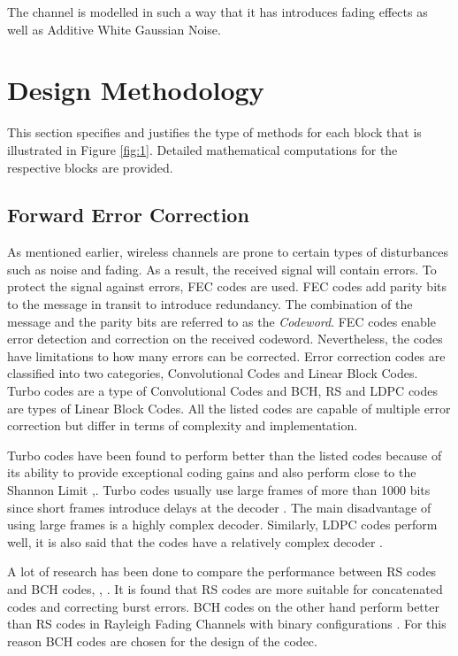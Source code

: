 \documentclass[pdftex,11pt,a4paper]{article}
\begin{document}
The channel is modelled in such a way that it has introduces fading effects as well as Additive White Gaussian Noise.

\section{Design Methodology}
This section specifies and justifies the type of methods for each block that is illustrated in Figure \ref{fig:1}. Detailed mathematical computations for the respective blocks are provided.

\subsection{Forward Error Correction}
As mentioned earlier, wireless channels are prone to certain types of disturbances such as noise and fading. As a result, the received signal will contain errors. To protect the signal against errors, FEC codes are used. FEC codes add parity bits to the message in transit to introduce redundancy. The combination of the message and the parity bits are referred to as the \textit{Codeword}. FEC codes enable error detection and correction on the received codeword. Nevertheless, the codes have limitations to how many errors can be corrected. Error correction codes are classified into two categories, Convolutional Codes and Linear Block Codes. Turbo codes are a type of Convolutional Codes and BCH, RS and LDPC codes are types of Linear Block Codes. All the listed codes are capable of multiple error correction but differ in terms of complexity and implementation.

Turbo codes have been found to perform better than the listed codes because of its ability to provide exceptional coding gains and also perform close to the Shannon Limit \cite{18},\cite{18_7}. Turbo codes usually use large frames of more than 1000 bits since short frames introduce delays at the decoder \cite{chris}. The main disadvantage of using large frames is a highly complex decoder. Similarly, LDPC codes perform well, it is also said that the codes have a relatively complex decoder \cite{7online}.

A lot of research has been done to compare the performance between RS codes and BCH codes\cite{22}, \cite{9}, \cite{24}. It is found that RS codes are more suitable for concatenated codes and correcting burst errors. BCH codes on the other hand perform better than RS codes in Rayleigh Fading Channels with binary configurations \cite{22}. For this reason BCH codes are chosen for the design of the codec.
\end{document}
